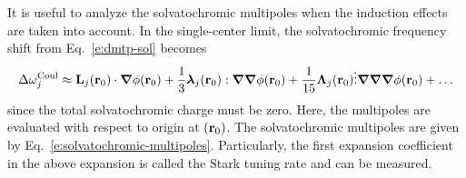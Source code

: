 \documentclass[a4paper,titlepage,twoside,fleqn,12pt]{book}
\newcommand{\BM}[1]{\ensuremath{\mbox{\boldmath${#1}$}}}
\begin{document}
\begin{refsection}
It is useful to analyze the solvatochromic multipoles 
when the induction effects are taken into account.
In the single\hyp{}center limit, the solvatochromic
frequency shift from Eq.~\eqref{e:dmtp-sol}
becomes
%
\begin{equation} \label{e:dmtp-solmmm}
 \Delta\omega_j^{\rm Coul} \approx  
                        {\bf L}_j({\bf r}_0) \cdot {\BM \nabla} \phi({\bf r}_0)   + 
      \frac{1}{3} {\BM \lambda}_j({\bf r}_0) : {\BM \nabla}  {\BM \nabla} \phi({\bf r}_0)   + 
     \frac{1}{15} {\BM \Lambda}_j({\bf r}_0) \vdots {\BM \nabla}  {\BM \nabla}  {\BM \nabla} \phi({\bf r}_0) + \ldots
\end{equation}
%
since the total solvatochromic charge must be zero. Here, the multipoles
are evaluated with respect to origin at $({\bf r}_0)$.
The solvatochromic multipoles are given by Eq.~\eqref{e:solvatochromic-multipoles}.
Particularly, the first expansion coefficient in the above expansion
is called the Stark tuning rate and can be measured.


\end{refsection}
\end{document}
